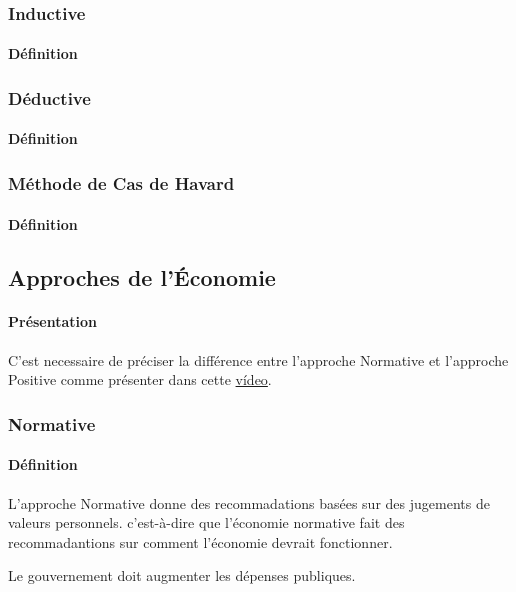 \documentclass{article}
\begin{document}
\subsubsection{Inductive}
\paragraph{Définition}

\subsubsection{Déductive}
\paragraph{Définition}

\subsubsection{Méthode de Cas de Havard}
\paragraph{Définition}


\subsection{Approches de l'Économie}
\paragraph{Présentation}C'est necessaire de préciser la différence entre l'approche Normative et l'approche Positive comme présenter dans cette \href{https://www.youtube.com/watch?v=X5i4tLiih5E}{vídeo}.

\subsubsection{Normative}
\paragraph{Définition}L'approche Normative donne des recommadations basées sur des jugements de valeurs personnels. c'est-à-dire que l'économie normative fait des recommadantions sur comment l'économie devrait fonctionner.
\begin{example}
    Le gouvernement doit augmenter les dépenses publiques.
\end{example}
\end{document}
